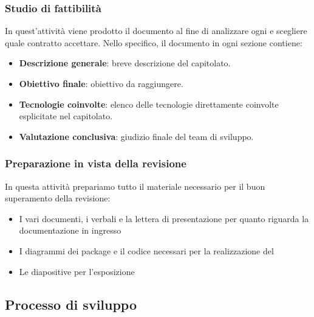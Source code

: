         \subsubsection{Studio di fattibilità}\label{PP:Fornitura:SdF}
        In quest'attività viene prodotto il documento \Doc{\SdFv} al fine di analizzare ogni  e scegliere quale contratto accettare.
        Nello specifico, il documento in ogni sezione contiene:
        	\begin{itemize}
        		\item \textbf{Descrizione generale}: breve descrizione del capitolato.
        		\item \textbf{Obiettivo finale}: obiettivo da raggiungere.
        		\item \textbf{Tecnologie coinvolte}: elenco delle tecnologie direttamente coinvolte esplicitate nel capitolato.
        		\item \textbf{Valutazione conclusiva}: giudizio finale del team di sviluppo.
        	\end{itemize}

        \subsubsection{Preparazione in vista della revisione}
		In questa attività prepariamo tutto il materiale necessario per il buon superamento della revisione:
		\begin{itemize}
			\item I vari documenti, i verbali e la lettera di presentazione per quanto riguarda la documentazione in ingresso
			\item I diagrammi dei package e il codice necessari per la realizzazione del 
			\item Le diapositive per l'esposizione
		\end{itemize}

    \subsection{Processo di sviluppo}\label{PP:Sviluppo}

